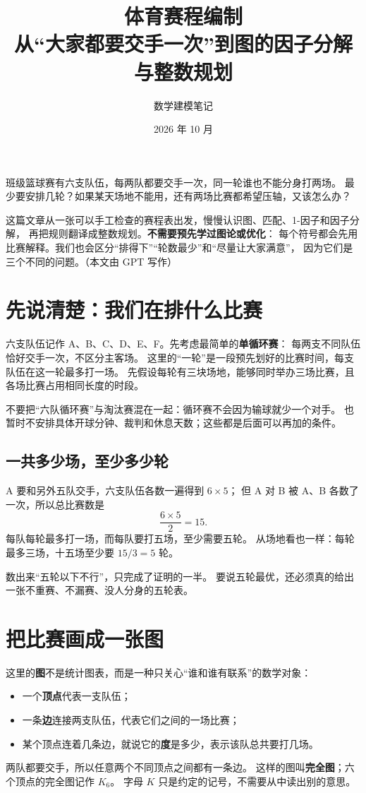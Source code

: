 \documentclass[UTF8,11pt,fontset=none]{ctexart}
\title{\bfseries 体育赛程编制\\[0.35em]
\large 从“大家都要交手一次”到图的因子分解与整数规划}
\author{数学建模笔记}
\date{2026 年 10 月}
\begin{document}
\maketitle\pagestyle{plain}\thispagestyle{empty}
\begin{keybox}[这篇文章想做的事]
班级篮球赛有六支队伍，每两队都要交手一次，同一轮谁也不能分身打两场。
最少要安排几轮？如果某天场地不能用，还有两场比赛都希望压轴，又该怎么办？

这篇文章从一张可以手工检查的赛程表出发，慢慢认识图、匹配、1-因子和因子分解，
再把规则翻译成整数规划。\textbf{不需要预先学过图论或优化}：
每个符号都会先用比赛解释。我们也会区分“排得下”“轮数最少”和“尽量让大家满意”，
因为它们是三个不同的问题。（本文由 GPT 写作）
\end{keybox}

\section{先说清楚：我们在排什么比赛}
六支队伍记作 A、B、C、D、E、F。先考虑最简单的\textbf{单循环赛}：
每两支不同队伍恰好交手一次，不区分主客场。
这里的“一轮”是一段预先划好的比赛时间，每支队伍在这一轮最多打一场。
先假设每轮有三块场地，能够同时举办三场比赛，且各场比赛占用相同长度的时段。

不要把“六队循环赛”与淘汰赛混在一起：循环赛不会因为输球就少一个对手。
也暂时不安排具体开球分钟、裁判和休息天数；这些都是后面可以再加的条件。

\subsection{一共多少场，至少多少轮}
A 要和另外五队交手，六支队伍各数一遍得到 $6\times5$；
但 A 对 B 被 A、B 各数了一次，所以总比赛数是
\[
\frac{6\times5}{2}=15.
\]
每队每轮最多打一场，而每队要打五场，至少需要五轮。
从场地看也一样：每轮最多三场，十五场至少要 $15/3=5$ 轮。

\begin{warnbox}
数出来“五轮以下不行”，只完成了证明的一半。
要说五轮最优，还必须真的给出一张不重赛、不漏赛、没人分身的五轮表。
\end{warnbox}

\section{把比赛画成一张图}
这里的\textbf{图}不是统计图表，而是一种只关心“谁和谁有联系”的数学对象：
\begin{itemize}
\item 一个\textbf{顶点}代表一支队伍；
\item 一条\textbf{边}连接两支队伍，代表它们之间的一场比赛；
\item 某个顶点连着几条边，就说它的\textbf{度}是多少，表示该队总共要打几场。
\end{itemize}
两队都要交手，所以任意两个不同顶点之间都有一条边。
这样的图叫\textbf{完全图}；六个顶点的完全图记作 $K_6$。
字母 $K$ 只是约定的记号，不需要从中读出别的意思。
\end{document}
